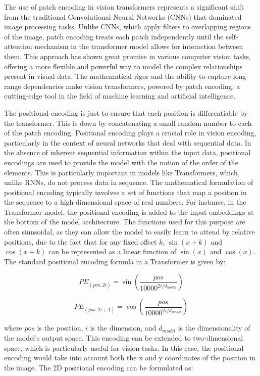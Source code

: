 \begin{spacing}{1.5}
\begin{sloppypar}
The use of patch encoding in vision transformers represents a significant shift from the traditional Convolutional Neural Networks (CNNs) that dominated image processing tasks. Unlike CNNs, which apply filters to overlapping regions of the image, patch encoding treats each patch independently until the self-attention mechanism in the transformer model allows for interaction between them. This approach has shown great promise in various computer vision tasks, offering a more flexible and powerful way to model the complex relationships present in visual data. The mathematical rigor and the ability to capture long-range dependencies make vision transformers, powered by patch encoding, a cutting-edge tool in the field of machine learning and artificial intelligence.


The positional encoding is just to ensure that each position is differentiable by the transformer. This is down by concatenating a small random number to each of the patch encoding. 
Positional encoding plays a crucial role in vision encoding, particularly in the context of neural networks that deal with sequential data. In the absence of inherent sequential information within the input data, positional encodings are used to provide the model with the notion of the order of the elements. This is particularly important in models like Transformers, which, unlike RNNs, do not process data in sequence. The mathematical formulation of positional encoding typically involves a set of functions that map a position in the sequence to a high-dimensional space of real numbers. For instance, in the Transformer model, the positional encoding is added to the input embeddings at the bottom of the model architecture. The functions used for this purpose are often sinusoidal, as they can allow the model to easily learn to attend by relative positions, due to the fact that for any fixed offset \( k \), \( \sin(x+k) \) and \( \cos(x+k) \) can be represented as a linear function of \( \sin(x) \) and \( \cos(x) \). The standard positional encoding formula in a Transformer is given by:

$$
PE_{(pos,2i)} = \sin\left(\frac{pos}{10000^{2i/d_{model}}}\right)
$$

$$
PE_{(pos,2i+1)} = \cos\left(\frac{pos}{10000^{2i/d_{model}}}\right)
$$

where \( pos \) is the position, \( i \) is the dimension, and \( d_{model} \) is the dimensionality of the model's output space. This encoding can be extended to two-dimensional space, which is particularly useful for vision tasks. In this case, the positional encoding would take into account both the x and y coordinates of the position in the image. The 2D positional encoding can be formulated as:


\end{sloppypar}
\end{spacing}
